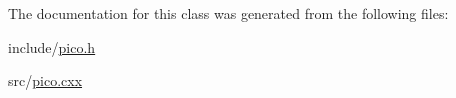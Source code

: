 The documentation for this class was generated from the following files\+:\begin{DoxyCompactItemize}
\item 
include/\hyperlink{pico_8h}{pico.\+h}\item 
src/\hyperlink{pico_8cxx}{pico.\+cxx}\end{DoxyCompactItemize}
